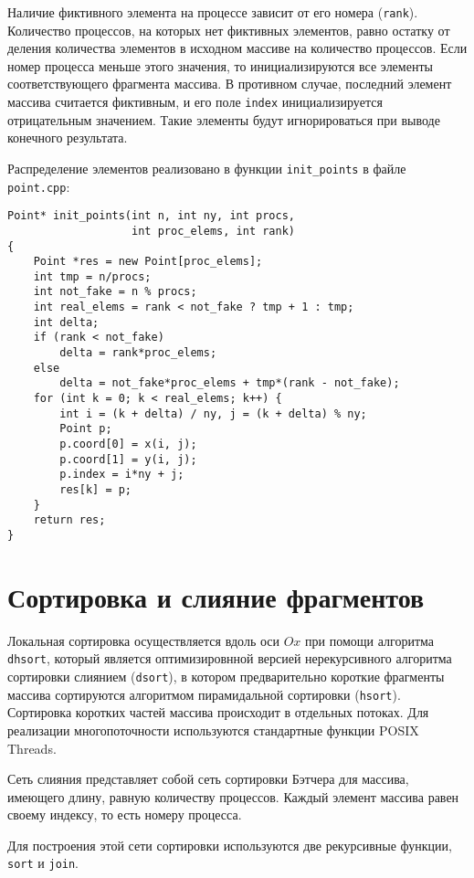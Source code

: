 \documentclass[oneside,final,14pt]{extreport}
\begin{document}
Наличие фиктивного элемента на процессе зависит от его номера (\texttt{rank}).
Количество процессов, на которых нет фиктивных элементов, равно остатку от
деления количества элементов в исходном массиве на количество процессов.
Если номер процесса меньше этого значения, то инициализируются все элементы
соответствующего фрагмента массива. В противном случае, последний элемент
массива считается фиктивным, и его поле \texttt{index} инициализируется
отрицательным значением. Такие элементы будут игнорироваться при выводе
конечного результата.

Распределение элементов реализовано в функции \texttt{init\_points} в
файле \texttt{point.cpp}:

\begin{verbatim}
Point* init_points(int n, int ny, int procs,
                   int proc_elems, int rank)
{
    Point *res = new Point[proc_elems];
    int tmp = n/procs;
    int not_fake = n % procs;
    int real_elems = rank < not_fake ? tmp + 1 : tmp;
    int delta;
    if (rank < not_fake)
        delta = rank*proc_elems;
    else
        delta = not_fake*proc_elems + tmp*(rank - not_fake);
    for (int k = 0; k < real_elems; k++) {
        int i = (k + delta) / ny, j = (k + delta) % ny;
        Point p;
        p.coord[0] = x(i, j);
        p.coord[1] = y(i, j);
        p.index = i*ny + j;
        res[k] = p;
    }
    return res;
}
\end{verbatim}

\section*{Сортировка и слияние фрагментов}

Локальная сортировка осуществляется вдоль оси $Ox$ при помощи алгоритма \texttt{dhsort},
который является оптимизировнной версией нерекурсивного алгоритма сортировки
слиянием (\texttt{dsort}), в котором предварительно короткие фрагменты
массива сортируются алгоритмом пирамидальной сортировки (\texttt{hsort}).
Сортировка коротких частей массива происходит в отдельных потоках.
Для реализации многопоточности используются стандартные функции
POSIX Threads.

Сеть слияния представляет собой сеть сортировки Бэтчера для массива, имеющего
длину, равную количеству процессов. Каждый элемент массива равен своему индексу,
то есть номеру процесса.

Для построения этой сети сортировки используются две рекурсивные функции,
\texttt{sort} и \texttt{join}.
\end{document}
